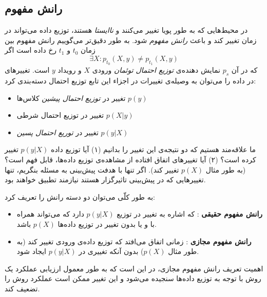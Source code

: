 
\subsection{
رانش مفهوم
\cite{conceptdriftadaptation2014}
}

در محیط‌هایی که به طور پویا تغییر می‌کنند و 
\textit{
ناایستا
} 
هستند، توزیع داده می‌تواند در زمان تغییر کند و باعث  
\textit{
رانش مفهوم
} 
شود. به طور دقیق‌تر می‌گوییم رانش مفهوم بین زمان 
$t_0$ 
و 
$t_1$ 
رخ داده است اگر 
\[
\exists X : p_{t_0} ( X , y ) \neq p_{t_1} ( X , y )
\]
که در آن 
$p_s$ 
نمایش دهنده‌ی 
\textit{
توزیع احتمال توئمان
} 
ورودی 
$X$ 
و رویداد
$y$ 
است. تغییرهای در داده را می‌توان به وصیله‌ی تغییرات در اجزاء این تابع توزیع احتمال دسته‌بندی کرد:
\begin{itemize}
\item 
تغییر در 
\textit{
توزیع احتمال پیشین
} 
کلاس‌ها 
$p(y)$

\item 
تغییر در توزیع احتمال شرطی 
$p( X | y )$

\item 
تغییر در 
\textit{
توریع احتمال پسین
}
$p ( y | X )$
\end{itemize}

ما علاقه‌مند هستیم که دو نتیجه‌ی این تغییر را بدانیم (۱) آیا توزیع داده 
$p( y | X )$ 
تغییر کرده است؟ (۲) آیا تغییرهای اتفاق افتاده از مشاهده‌ی توزیع داده‌ها، قابل فهم است؟ (به طور مثال 
$p( X )$ 
تغییر کند). اگر تنها با هدفت پیش‌بینی به مسئله بنگریم، تنها تغییرهایی که در پیش‌بینی تاثیرگزار هستند نیازمند تطبیق خواهند بود.


به طور کلّی می‌توان دو دسته رانش را تعریف کرد:
\begin{itemize}
\item \textbf{
رانش مفهوم حقیقی
}:‌ 
که اشاره به تغییر در توزیع 
$p( y | X )$ 
دارد که می‌تواند همراه با و یا بدون تغییر در توزیع داده‌ها 
$p(X)$ 
باشد.

\item \textbf{
رانش مفهوم مجازی
}: 
زمانی اتفاق  می‌افتد که توزیع داده‌ی ورودی تغییر کند (به طور مثال 
$p(X)$) 
بدون آنکه تغییری در 
$p( y | X )$ 
ایجاد شود.

\end{itemize}
اهمیت تعریف رانش مفهوم مجازی، در این است که به طور معمول ارزیابی عملکرد یک روش با توجه به توزیع داده‌ها سنجیده می‌شود و این تغییر ممکن است عملکرد روش را تضعیف کند.


